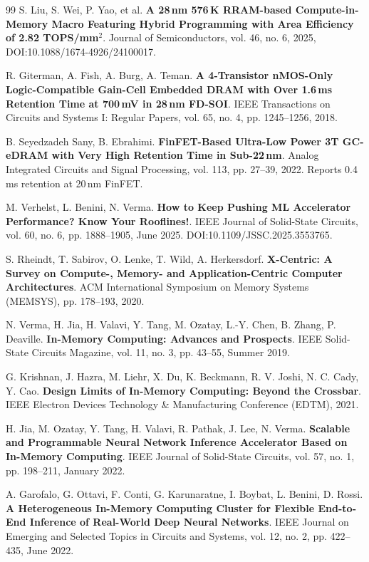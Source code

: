 \documentclass[11pt, a4paper]{ctexart}
\let\emph\textbf
\theoremstyle{definition}
\begin{document}
\begin{thebibliography}{99}
S. Liu, S. Wei, P. Yao, et al.
\emph{A 28\,nm 576\,K RRAM-based Compute-in-Memory Macro Featuring Hybrid Programming with Area Efficiency of 2.82 TOPS/mm$^2$}.
Journal of Semiconductors, vol. 46, no. 6, 2025, DOI:10.1088/1674-4926/24100017.

R. Giterman, A. Fish, A. Burg, A. Teman.
\emph{A 4-Transistor nMOS-Only Logic-Compatible Gain-Cell Embedded DRAM with Over 1.6\,ms Retention Time at 700\,mV in 28\,nm FD-SOI}.
IEEE Transactions on Circuits and Systems I: Regular Papers, vol. 65, no. 4, pp. 1245--1256, 2018.

B. Seyedzadeh Sany, B. Ebrahimi.
\emph{FinFET-Based Ultra-Low Power 3T GC-eDRAM with Very High Retention Time in Sub-22\,nm}.
Analog Integrated Circuits and Signal Processing, vol. 113, pp. 27--39, 2022. Reports 0.4\,ms retention at 20\,nm FinFET.


M. Verhelst, L. Benini, N. Verma.
\emph{How to Keep Pushing ML Accelerator Performance? Know Your Rooflines!}.
IEEE Journal of Solid-State Circuits, vol. 60, no. 6, pp. 1888--1905, June 2025. DOI:10.1109/JSSC.2025.3553765.

S. Rheindt, T. Sabirov, O. Lenke, T. Wild, A. Herkersdorf.
\emph{X-Centric: A Survey on Compute-, Memory- and Application-Centric Computer Architectures}.
ACM International Symposium on Memory Systems (MEMSYS), pp. 178--193, 2020.

N. Verma, H. Jia, H. Valavi, Y. Tang, M. Ozatay, L.-Y. Chen, B. Zhang, P. Deaville.
\emph{In-Memory Computing: Advances and Prospects}.
IEEE Solid-State Circuits Magazine, vol. 11, no. 3, pp. 43--55, Summer 2019.

G. Krishnan, J. Hazra, M. Liehr, X. Du, K. Beckmann, R. V. Joshi, N. C. Cady, Y. Cao.
\emph{Design Limits of In-Memory Computing: Beyond the Crossbar}.
IEEE Electron Devices Technology \& Manufacturing Conference (EDTM), 2021.

H. Jia, M. Ozatay, Y. Tang, H. Valavi, R. Pathak, J. Lee, N. Verma.
\emph{Scalable and Programmable Neural Network Inference Accelerator Based on In-Memory Computing}.
IEEE Journal of Solid-State Circuits, vol. 57, no. 1, pp. 198--211, January 2022.

A. Garofalo, G. Ottavi, F. Conti, G. Karunaratne, I. Boybat, L. Benini, D. Rossi.
\emph{A Heterogeneous In-Memory Computing Cluster for Flexible End-to-End Inference of Real-World Deep Neural Networks}.
IEEE Journal on Emerging and Selected Topics in Circuits and Systems, vol. 12, no. 2, pp. 422--435, June 2022.


\end{thebibliography}
\end{document}
